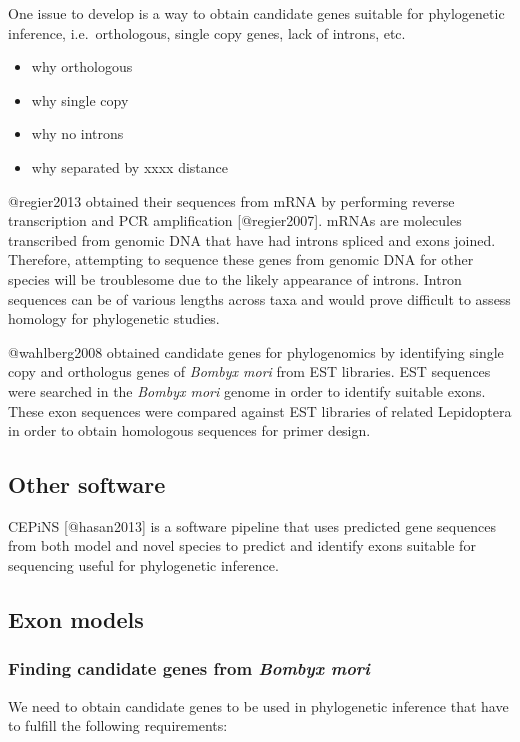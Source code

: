 \documentclass[a4paper]{article}
\begin{document}
One issue to develop is a way to obtain candidate genes suitable for
phylogenetic inference, i.e.~orthologous, single copy genes, lack of
introns, etc.

\begin{itemize}
\item
  why orthologous
\item
  why single copy
\item
  why no introns
\item
  why separated by xxxx distance
\end{itemize}

@regier2013 obtained their sequences from mRNA by performing reverse
transcription and PCR amplification {[}@regier2007{]}. mRNAs are
molecules transcribed from genomic DNA that have had introns spliced and
exons joined. Therefore, attempting to sequence these genes from genomic
DNA for other species will be troublesome due to the likely appearance
of introns. Intron sequences can be of various lengths across taxa and
would prove difficult to assess homology for phylogenetic studies.

@wahlberg2008 obtained candidate genes for phylogenomics by identifying
single copy and orthologus genes of \emph{Bombyx mori} from EST
libraries. EST sequences were searched in the \emph{Bombyx mori} genome
in order to identify suitable exons. These exon sequences were compared
against EST libraries of related Lepidoptera in order to obtain
homologous sequences for primer design.

\subsection{Other software}

CEPiNS {[}@hasan2013{]} is a software pipeline that uses predicted gene
sequences from both model and novel species to predict and identify
exons suitable for sequencing useful for phylogenetic inference.

\subsection{Exon models}

\subsubsection{Finding candidate genes from \emph{Bombyx mori}}

We need to obtain candidate genes to be used in phylogenetic inference
that have to fulfill the following requirements:
\end{document}
